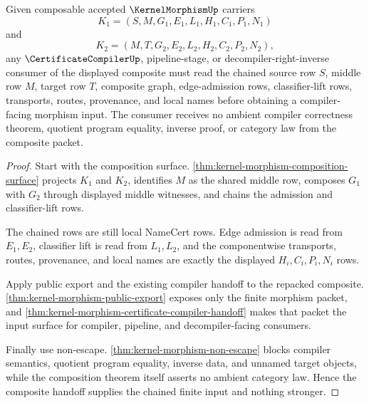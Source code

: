 \begin{theorem}
\label{thm:kernel-morphism-composite-compiler-handoff-boundary}
Given composable accepted $\KernelMorphismUp$ carriers
$$
K_{1}=(S,M,G_{1},E_{1},L_{1},H_{1},C_{1},P_{1},N_{1})
$$
and
$$
K_{2}=(M,T,G_{2},E_{2},L_{2},H_{2},C_{2},P_{2},N_{2}),
$$
any $\CertificateCompilerUp$, pipeline-stage, or decompiler-right-inverse consumer of the displayed composite must read the chained source row $S$, middle row $M$, target row $T$, composite graph, edge-admission rows, classifier-lift rows, transports, routes, provenance, and local names before obtaining a compiler-facing morphism input. The consumer receives no ambient compiler correctness theorem, quotient program equality, inverse proof, or category law from the composite packet.
\end{theorem}
\begin{proof}
Start with the composition surface. \autoref{thm:kernel-morphism-composition-surface} projects $K_{1}$ and $K_{2}$, identifies $M$ as the shared middle row, composes $G_{1}$ with $G_{2}$ through displayed middle witnesses, and chains the admission and classifier-lift rows.

The chained rows are still local NameCert rows. Edge admission is read from $E_{1},E_{2}$, classifier lift is read from $L_{1},L_{2}$, and the componentwise transports, routes, provenance, and local names are exactly the displayed $H_{i},C_{i},P_{i},N_{i}$ rows.

Apply public export and the existing compiler handoff to the repacked composite. \autoref{thm:kernel-morphism-public-export} exposes only the finite morphism packet, and \autoref{thm:kernel-morphism-certificate-compiler-handoff} makes that packet the input surface for compiler, pipeline, and decompiler-facing consumers.

Finally use non-escape. \autoref{thm:kernel-morphism-non-escape} blocks compiler semantics, quotient program equality, inverse data, and unnamed target objects, while the composition theorem itself asserts no ambient category law. Hence the composite handoff supplies the chained finite input and nothing stronger.
\end{proof}

